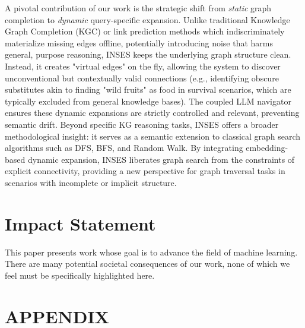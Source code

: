 \documentclass{article}
\theoremstyle{plain}
\theoremstyle{definition}
\theoremstyle{remark}
\begin{document}
A pivotal contribution of our work is the strategic shift from \textit{static} graph completion to \textit{dynamic} query-specific expansion. Unlike traditional Knowledge Graph Completion (KGC) or link prediction methods which indiscriminately materialize missing edges offline, potentially introducing noise that harms general, purpose reasoning, INSES keeps the underlying graph structure clean. Instead, it creates "virtual edges" on the fly, allowing the system to discover unconventional but contextually valid connections (e.g., identifying obscure substitutes akin to finding "wild fruits" as food in survival scenarios, which are typically excluded from general knowledge bases). The coupled LLM navigator ensures these dynamic expansions are strictly controlled and relevant, preventing semantic drift. Beyond specific KG reasoning tasks, INSES offers a broader methodological insight: it serves as a semantic extension to classical graph search algorithms such as DFS, BFS, and Random Walk. By integrating embedding-based dynamic expansion, INSES liberates graph search from the constraints of explicit connectivity, providing a new perspective for graph traversal tasks in scenarios with incomplete or implicit structure.

\clearpage
\section*{Impact Statement}
This paper presents work whose goal is to advance the field of machine learning. There are many potential societal consequences of our work, none of which we feel must be specifically highlighted here.





\newpage
\appendix
\onecolumn
\section*{APPENDIX}
\end{document}
